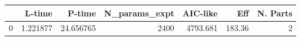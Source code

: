 \begin{tabular}{lrrrrrr}
\toprule
{} &    L-time &     P-time &  N\_params\_expt &  AIC-like &     Eff &  N. Parts \\
\midrule
0 &  1.221877 &  24.656765 &           2400 &  4793.681 &  183.36 &         2 \\
\bottomrule
\end{tabular}
